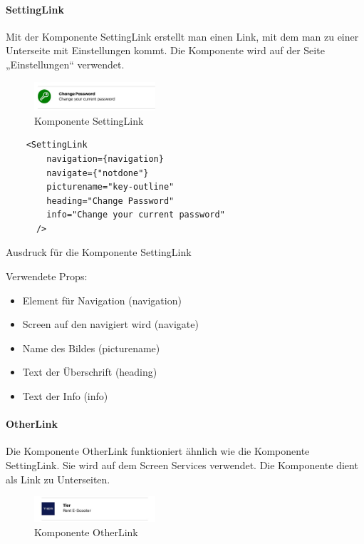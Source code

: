\paragraph{SettingLink}Mit der Komponente SettingLink erstellt man einen Link, mit dem man zu einer Unterseite mit Einstellungen kommt. Die Komponente wird auf der Seite „Einstellungen“ verwendet.\\

\begin{figure}[H]
  \centering
  \includegraphics[width=0.4\textwidth]{images/app-screenshots/settinglink.png}
  \caption{Komponente SettingLink}
  \label{fig:settinglink}
\end{figure}


\begin{listing}[H]
\begin{verbatim}
    <SettingLink
        navigation={navigation}
        navigate={"notdone"}
        picturename="key-outline"
        heading="Change Password"
        info="Change your current password"
      />
 \end{verbatim}
 \caption{Ausdruck für die Komponente SettingLink}
 \label{lst:jsxsettinglink}
\end{listing}
Verwendete Props:
\begin{itemize}
  \item Element für Navigation (navigation)
  \item Screen auf den navigiert wird (navigate)
  \item Name des Bildes (picturename)
  \item Text der Überschrift (heading)
  \item Text der Info (info)
\end{itemize}


\paragraph{OtherLink}Die Komponente OtherLink funktioniert ähnlich wie die Komponente SettingLink. Sie wird auf dem Screen Services verwendet. Die Komponente dient als Link zu Unterseiten.\\
\begin{figure}[H]
  \centering
  \includegraphics[width=0.4\textwidth]{images/app-screenshots/otherlink.png}
  \caption{Komponente OtherLink}
  \label{fig:otherlink}
\end{figure}

